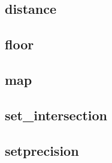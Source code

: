    \subsection{distance}
            
    \subsection{floor}
            
    \subsection{map}
            
    \subsection{set_intersection}
            
    \subsection{setprecision}
            